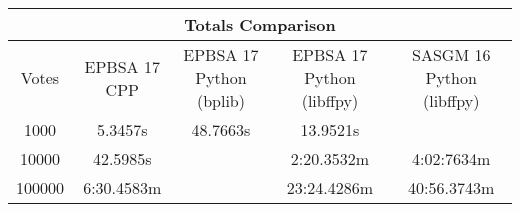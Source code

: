 \documentclass{standalone}
\begin{document}
\begin{tabular}{ |c|c|c|c|c| }
    \hline
    \multicolumn{5}{|c|}{Totals Comparison} \\
    \hline
    Votes & EPBSA 17 CPP & EPBSA 17 Python (bplib) & EPBSA 17 Python (libffpy) & SASGM 16 Python (libffpy)\\
    \hline
    1000 & 5.3457s & 48.7663s & 13.9521s & \\
    10000 & 42.5985s & & 2:20.3532m & 4:02:7634m \\
    100000 & 6:30.4583m & & 23:24.4286m & 40:56.3743m \\
    \hline
\end{tabular}
\end{document}
